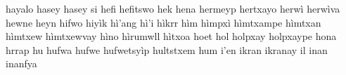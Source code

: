hayalo\hspace{2mm}
hasey\hspace{2mm}
hasey si\hspace{2mm}
hefi\hspace{2mm}
hefitswo\hspace{2mm}
hek\hspace{2mm}
hena\hspace{2mm}
hermeyp\hspace{2mm}
hertxayo\hspace{2mm}
herwì\hspace{2mm}
herwìva\hspace{2mm}
hewne\hspace{2mm}
heyn\hspace{2mm}
hifwo\hspace{2mm}
hiyìk\hspace{2mm}
hì'ang\hspace{2mm}
hì'i\hspace{2mm}
hìkrr\hspace{2mm}
hìm\hspace{2mm}
hìmpxì\hspace{2mm}
hìmtxampe\hspace{2mm}
hìmtxan\hspace{2mm}
hìmtxew\hspace{2mm}
hìmtxewvay\hspace{2mm}
hìno\hspace{2mm}
hìrumwll\hspace{2mm}
hìtxoa\hspace{2mm}
hoet\hspace{2mm}
hol\hspace{2mm}
holpxay\hspace{2mm}
holpxaype\hspace{2mm}
hona\hspace{2mm}
hrrap\hspace{2mm}
hu\hspace{2mm}
hufwa\hspace{2mm}
hufwe\hspace{2mm}
hufwetsyìp\hspace{2mm}
hultstxem\hspace{2mm}
hum\hspace{2mm}
i'en\hspace{2mm}
ikran\hspace{2mm}
ikranay\hspace{2mm}
il\hspace{2mm}
inan\hspace{2mm}
inanfya\hspace{2mm}
